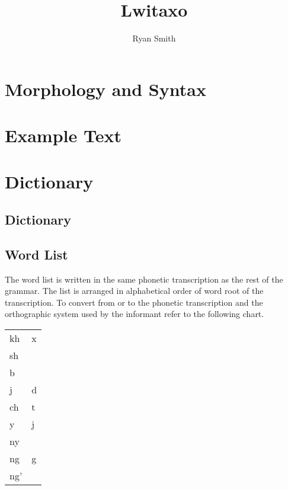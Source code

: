 \documentclass[letterpaper]{report}
\author{Ryan Smith}
\title{Lwitaxo}
\begin{document}
\maketitle
\tableofcontents





\chapter{Morphology and Syntax}







\chapter{Example Text}



\chapter{Dictionary}

\section{Dictionary}



\section{Word List}
The word list is written in the same phonetic transcription as the rest of the grammar.  The list is arranged in alphabetical order of word root of the transcription.  To convert from or to the phonetic transcription and the orthographic system used by the informant refer to the following chart.\\
\begin{tabular}{ll}
\addlinespace
\toprule
kh    & x \\
sh    & \esh{} \\
b     & \beta{} \\
j     & d\ezh{} \\
ch    & t\esh{} \\
y     & j \\
ny    & \palnas{} \\
ng    & \engma{}g \\
ng'   & \engma{} \\
\bottomrule
\end{tabular}

\begin{multicols}{2}{

}
\end{multicols}
\end{document}
